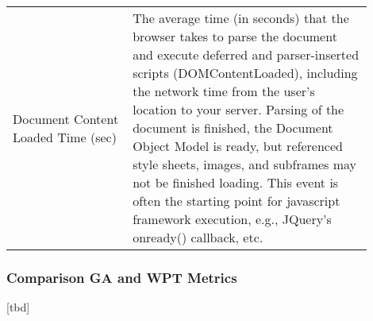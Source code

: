 \begin{center}
\begin{tabular}{ p{0.3\linewidth} | p{0.6\linewidth} }
	Document Content Loaded Time (sec) & The average time (in seconds) that the browser takes to parse the document and execute deferred and parser-inserted scripts (DOMContentLoaded), including the network time from the user's location to your server. Parsing of the document is finished, the Document Object Model is ready, but referenced style sheets, images, and subframes may not be finished loading. This event is often the starting point for javascript framework execution, e.g., JQuery's onready() callback, etc.  \\
	\end{tabular}
\end{center}











\subsubsection{Comparison GA and WPT Metrics}

[tbd]





